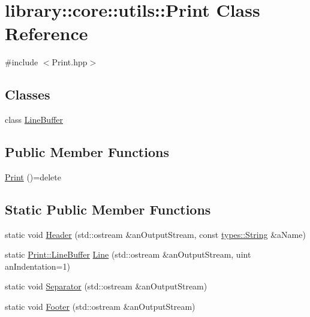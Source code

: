 \hypertarget{classlibrary_1_1core_1_1utils_1_1_print}{}\section{library\+:\+:core\+:\+:utils\+:\+:Print Class Reference}
\label{classlibrary_1_1core_1_1utils_1_1_print}


{\ttfamily \#include $<$Print.\+hpp$>$}

\subsection*{Classes}
\begin{DoxyCompactItemize}
\item 
class \hyperlink{classlibrary_1_1core_1_1utils_1_1_print_1_1_line_buffer}{Line\+Buffer}
\end{DoxyCompactItemize}
\subsection*{Public Member Functions}
\begin{DoxyCompactItemize}
\item 
\hyperlink{classlibrary_1_1core_1_1utils_1_1_print_a2d7ca0fac9e9dc7fa8b8b40f7b784198}{Print} ()=delete
\end{DoxyCompactItemize}
\subsection*{Static Public Member Functions}
\begin{DoxyCompactItemize}
\item 
static void \hyperlink{classlibrary_1_1core_1_1utils_1_1_print_a828afa2d09d997e2ad5b5a93ab81bcb0}{Header} (std\+::ostream \&an\+Output\+Stream, const \hyperlink{classlibrary_1_1core_1_1types_1_1_string}{types\+::\+String} \&a\+Name)
\item 
static \hyperlink{classlibrary_1_1core_1_1utils_1_1_print_1_1_line_buffer}{Print\+::\+Line\+Buffer} \hyperlink{classlibrary_1_1core_1_1utils_1_1_print_ab4d98c65fbb58213358df534dd1f6d65}{Line} (std\+::ostream \&an\+Output\+Stream, uint an\+Indentation=1)
\item 
static void \hyperlink{classlibrary_1_1core_1_1utils_1_1_print_a58361390194e28388d3ac0ec0910cc0c}{Separator} (std\+::ostream \&an\+Output\+Stream)
\item 
static void \hyperlink{classlibrary_1_1core_1_1utils_1_1_print_a5c9f1797eafda1b8e8ef95d5a2902df2}{Footer} (std\+::ostream \&an\+Output\+Stream)
\end{DoxyCompactItemize}


